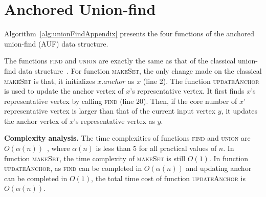 \section{Anchored Union-find}
\label{app:auf}

Algorithm~\ref{alg:unionFindAppendix} presents
the four functions of the anchored union-find (AUF) data structure.

The functions \textsc{find} and \textsc{union} are exactly the same
as that of the classical union-find data structure~\cite{unionFind}.
For function \textsc{makeSet}, the only change made on the classical \textsc{makeSet}
is that, it initializes $x.anchor$ as $x$ (line 2).
The function \textsc{updateAnchor} is used to update the anchor vertex of $x$'s representative vertex.
It first finds $x$'s representative vertex by calling \textsc{find} (line 20).
Then, if the core number of $x$' representative vertex is larger than that of the current input vertex $y$,
it updates the anchor vertex of $x$'s representative vertex as $y$.

\textbf{Complexity analysis.}
The time complexities of functions \textsc{find} and \textsc{union} are $O(\alpha(n))$~\cite{unionFind},
where $\alpha(n)$ is less than 5 for all practical values of $n$.
In function \textsc{makeSet}, 
the time complexity of \textsc{makeSet} is still $O(1)$.
In function \textsc{updateAnchor}, as \textsc{find} can be completed in $O(\alpha(n))$
and updating anchor can be completed in $O(1)$,
the total time cost of function \textsc{updateAnchor} is $O(\alpha(n))$. 